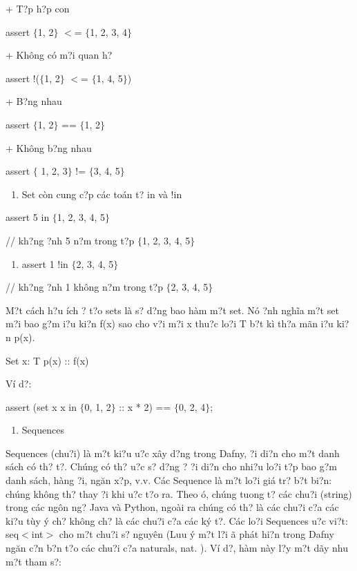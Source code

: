 \documentclass{article} %
\begin{document}
\noindent + T?p h?p con

\noindent assert $\{$1, 2$\}$ $<$= $\{$1, 2, 3, 4$\}$

\noindent + Kh\^{o}ng c\'{o} m?i quan h?

\noindent assert !($\{$1, 2$\}$ $<$= $\{$1, 4, 5$\}$)

\noindent + B?ng nhau

\noindent assert $\{$1, 2$\}$ == $\{$1, 2$\}$

\noindent + Kh\^{o}ng b?ng nhau

\noindent assert $\{$ 1, 2, 3$\}$ != $\{$3, 4, 5$\}$

\begin{enumerate}
\item  Set c\`{o}n cung c?p c\'{a}c to\'{a}n t? in v\`{a} !in
\end{enumerate}

\noindent assert 5 in $\{$1, 2, 3, 4, 5$\}$

\noindent // kh?ng {\dj}?nh 5 n?m trong t?p $\{$1, 2, 3, 4, 5$\}$

\begin{enumerate}
\item  assert 1 !in $\{$2, 3, 4, 5$\}$
\end{enumerate}

\noindent // kh?ng {\dj}?nh 1 kh\^{o}ng n?m trong t?p $\{$2, 3, 4, 5$\}$

M?t c\'{a}ch h?u \'{i}ch {\dj}? t?o sets l\`{a} s? d?ng bao h\`{a}m m?t set. N\'{o} {\dj}?nh ngh\~{i}a m?t set m?i bao g?m {\dj}i?u ki?n f(x) sao cho v?i m?i x thu?c lo?i T b?t k\`{i} th?a m\~{a}n {\dj}i?u ki?n p(x).

\noindent Set x: T {\textbar} p(x) :: f(x)

\noindent V\'{i} d?: 

\noindent assert (set x {\textbar} x in $\{$0, 1, 2$\}$ :: x * 2) == $\{$0, 2, 4$\}$;

\begin{enumerate}
\item  Sequences\underbar{}
\end{enumerate}

Sequences (chu?i) l\`{a} m?t ki?u {\dj}u?c x\^{a}y d?ng trong Dafny, {\dj}?i di?n cho m?t danh s\'{a}ch c\'{o} th? t?. Ch\'{u}ng c\'{o} th? {\dj}u?c s? d?ng {\dj}? {\dj}?i di?n cho nhi?u lo?i t?p bao g?m danh s\'{a}ch, h\`{a}ng {\dj}?i, ng\u{a}n x?p, v.v. C\'{a}c Sequence l\`{a} m?t lo?i gi\'{a} tr? b?t bi?n: ch\'{u}ng kh\^{o}ng th? thay {\dj}?i khi {\dj}u?c t?o ra. Theo {\dj}\'{o}, ch\'{u}ng tuong t? c\'{a}c chu?i (string) trong c\'{a}c ng\^{o}n ng? Java v\`{a} Python, ngo\`{a}i ra ch\'{u}ng c\'{o} th? l\`{a} c\'{a}c chu?i c?a c\'{a}c ki?u t\`{u}y \'{y} ch? kh\^{o}ng ch? l\`{a} c\'{a}c chu?i c?a c\'{a}c k\'{y} t?. C\'{a}c lo?i Sequences {\dj}u?c vi?t: seq$<$int$>$ cho m?t chu?i s? nguy\^{e}n (Luu \'{y} m?t l?i {\dj}\~{a} ph\'{a}t hi?n trong Dafny ng\u{a}n c?n b?n t?o c\'{a}c chu?i c?a naturals, nat. ). V\'{i} d?, h\`{a}m n\`{a}y l?y m?t d\~{a}y nhu m?t tham s?:
\end{document}
